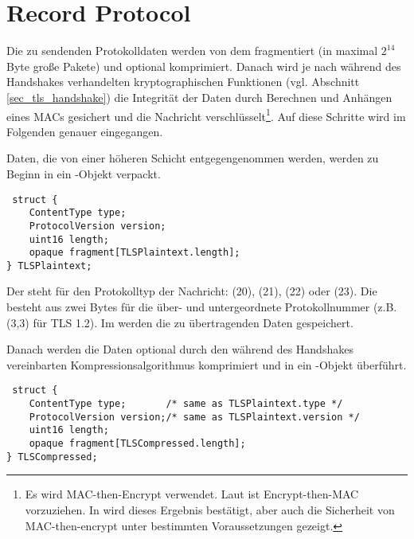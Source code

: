 \section{Record Protocol}
Die zu sendenden Protokolldaten werden von dem \recordprotocol{} fragmentiert (in maximal \(2^{14}\) Byte große Pakete) und optional komprimiert. Danach wird je nach während des Handshakes verhandelten kryptographischen Funktionen (vgl. Abschnitt \ref{sec_tls_handshake}) die Integrität der Daten durch Berechnen und Anhängen eines MACs gesichert und die Nachricht verschlüsselt\footnote{Es wird MAC-then-Encrypt verwendet. Laut \cite{AE2000} ist Encrypt-then-MAC vorzuziehen. In \cite{krawczyk01} wird dieses Ergebnis bestätigt, aber auch die Sicherheit von MAC-then-encrypt unter bestimmten Voraussetzungen gezeigt.}. Auf diese Schritte wird im Folgenden genauer eingegangen.

Daten, die von einer höheren Schicht entgegengenommen werden, werden zu Beginn in ein -Objekt verpackt. 

\begin{lstlisting}
 struct {
	ContentType type;  
	ProtocolVersion version; 
	uint16 length;
	opaque fragment[TLSPlaintext.length];
} TLSPlaintext;
\end{lstlisting}

%

Der  steht für den Protokolltyp der Nachricht: \changecipherspecprotocol{} (20), \alertprotocol{} (21), \handshakeprotocol{} (22) oder \applicationdataprotocol{} (23). Die  besteht aus zwei Bytes für die über- und untergeordnete Protokollnummer (z.B. (3,3) für TLS 1.2). Im  werden die zu übertragenden Daten gespeichert.

Danach werden die Daten optional durch den während des Handshakes vereinbarten Kompressionsalgorithmus komprimiert und in ein -Objekt überführt.

\begin{lstlisting}
 struct {
	ContentType type;       /* same as TLSPlaintext.type */
	ProtocolVersion version;/* same as TLSPlaintext.version */
	uint16 length;
	opaque fragment[TLSCompressed.length];
} TLSCompressed;
\end{lstlisting}

